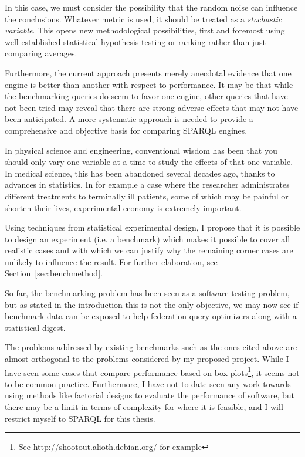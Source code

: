\documentclass{llncs}
\begin{document}
In this case, we must consider the possibility that the random noise
can influence the conclusions. Whatever metric is used, it should be
treated as a \emph{stochastic variable}.
This opens new methodological possibilities, first and foremost
using well-established statistical hypothesis testing or ranking
rather than just comparing averages.

Furthermore, the current approach presents merely anecdotal evidence
that one engine is better than another with respect to
performance. It may be that while the benchmarking queries do seem to
favor one engine, other queries that have not been tried may reveal
that there are strong adverse effects that may not have been
anticipated. A more systematic approach is needed to provide a
comprehensive and objective basis for comparing SPARQL engines.

In physical science and engineering, conventional wisdom has been that
you should only vary one variable at a time to study the effects of
that one variable. In medical science, this has been abandoned several
decades ago, thanks to advances in statistics. In for example a case where
the researcher administrates different treatments to terminally ill
patients, some of which may be painful or shorten their lives,
experimental economy is extremely important.

Using techniques from statistical experimental design, I propose
that it is possible to design an experiment (i.e. a benchmark) which
makes it possible to cover all realistic cases and with which we can justify
why the remaining corner cases are unlikely to influence the
result. For further elaboration, see Section~\ref{sec:benchmethod}.

So far, the benchmarking problem has been seen as a software testing
problem, but as stated in the introduction this is not the only
objective, we may now see if benchmark data can be exposed to help
federation query optimizers along with a statistical digest.

The problems addressed by existing benchmarks such as the ones cited
above are almost orthogonal to the problems considered by my proposed
project. While I have seen some cases that compare performance based
on box plots\footnote{See \url{http://shootout.alioth.debian.org/} for
  example}, it seems not to be common practice. Furthermore, I have not to date seen
any work towards using methods like factorial designs to evaluate
the performance of software, but there may be a limit in terms of
complexity for where it is feasible, and I will restrict myself to
SPARQL for this thesis.
\end{document}
